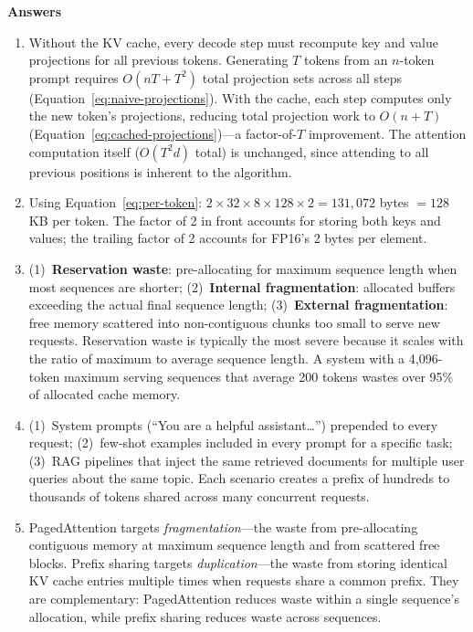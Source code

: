 \medskip
\noindent\textbf{Answers}

\begin{enumerate}
  \item Without the KV cache, every decode step must recompute key and value projections for all previous tokens. Generating $T$ tokens from an $n$-token prompt requires $O(nT + T^2)$ total projection sets across all steps (Equation~\ref{eq:naive-projections}). With the cache, each step computes only the new token's projections, reducing total projection work to $O(n + T)$ (Equation~\ref{eq:cached-projections})---a factor-of-$T$ improvement. The attention computation itself ($O(T^2 d)$ total) is unchanged, since attending to all previous positions is inherent to the algorithm.

  \item Using Equation~\ref{eq:per-token}: $2 \times 32 \times 8 \times 128 \times 2 = 131{,}072$ bytes $= 128$\,KB per token. The factor of 2 in front accounts for storing both keys and values; the trailing factor of 2 accounts for FP16's 2 bytes per element.

  \item (1)~\textbf{Reservation waste}: pre-allocating for maximum sequence length when most sequences are shorter; (2)~\textbf{Internal fragmentation}: allocated buffers exceeding the actual final sequence length; (3)~\textbf{External fragmentation}: free memory scattered into non-contiguous chunks too small to serve new requests. Reservation waste is typically the most severe because it scales with the ratio of maximum to average sequence length. A system with a 4,096-token maximum serving sequences that average 200 tokens wastes over 95\% of allocated cache memory.

  \item (1)~System prompts (``You are a helpful assistant\ldots'') prepended to every request; (2)~few-shot examples included in every prompt for a specific task; (3)~RAG pipelines that inject the same retrieved documents for multiple user queries about the same topic. Each scenario creates a prefix of hundreds to thousands of tokens shared across many concurrent requests.

  \item PagedAttention targets \emph{fragmentation}---the waste from pre-allocating contiguous memory at maximum sequence length and from scattered free blocks. Prefix sharing targets \emph{duplication}---the waste from storing identical KV cache entries multiple times when requests share a common prefix. They are complementary: PagedAttention reduces waste within a single sequence's allocation, while prefix sharing reduces waste across sequences.


\end{enumerate}
